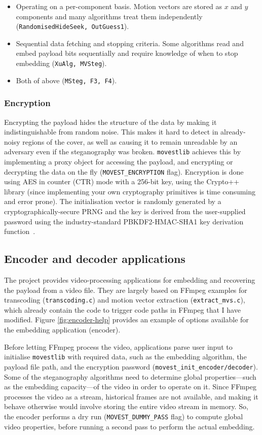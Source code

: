 \documentclass[12pt,british,twoside,notitlepage,usenames,dvipsnames,hypens,final]{report}
\numberwithin{equation}{section}
\numberwithin{figure}{section}
\begin{document}
\begin{itemize}
\item Operating on a per-component basis. Motion vectors are stored as $x$ and $y$ components and many algorithms treat them independently (\texttt{RandomisedHideSeek, OutGuess1}).
\item Sequential data fetching and stopping criteria. Some algorithms read and embed payload bits sequentially and require knowledge of when to stop embedding (\texttt{XuAlg, MVSteg}).
\item Both of above (\texttt{MSteg, F3, F4}).
\end{itemize}

\subsubsection{Encryption}
\label{encryption}
Encrypting the payload hides the structure of the data by making it indistinguishable from random noise. This makes it hard to detect in already-noisy regions of the cover, as well as causing it to remain unreadable by an adversary even if the steganography was broken. \texttt{movestlib} achieves this by implementing a proxy object for accessing the payload, and encrypting or decrypting the data on the fly (\texttt{MOVEST\_ENCRYPTION} flag). Encryption is done using AES in counter (CTR) mode with a 256-bit key, using the Crypto++ library (since implementing your own cryptography primitives is time consuming and error prone). The initialisation vector is randomly generated by a cryptographically-secure PRNG and the key is derived from the user-supplied password using the industry-standard PBKDF2-HMAC-SHA1 key derivation function~\cite{kaliski2000rfc}.

\subsection{Encoder and decoder applications}
\label{enc-dec-bin}
The project provides video-processing applications for embedding and recovering the payload from a video file. They are largely based on FFmpeg examples for transcoding (\texttt{transcoding.c}) and motion vector extraction (\texttt{extract\_mvs.c}), which already contain the code to trigger code paths in FFmpeg that I have modified. Figure \ref{fig:encoder-help} provides an example of options available for the embedding application (encoder).

Before letting FFmpeg process the video, applications parse user input to initialise \texttt{movestlib} with required data, such as the embedding algorithm, the payload file path, and the encryption password (\texttt{movest\_init\_encoder/decoder}). Some of the steganography algorithms need to determine global properties---such as the embedding capacity---of the video in order to operate on it. Since FFmpeg processes the video as a stream, historical frames are not available, and making it behave otherwise would involve storing the entire video stream in memory. So, the encoder performs a dry run (\texttt{MOVEST\_DUMMY\_PASS} flag) to compute global video properties, before running a second pass to perform the actual embedding.
\end{document}
